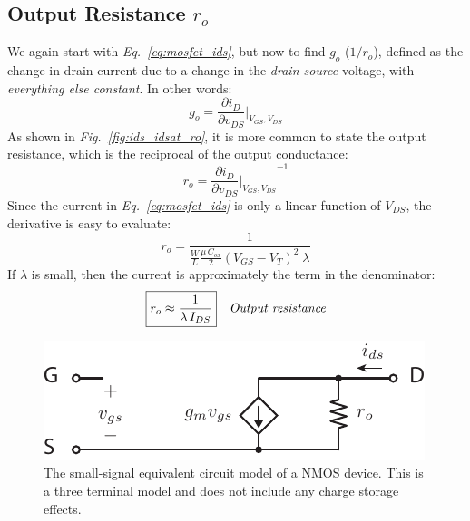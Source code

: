 \subsection{Output Resistance \texorpdfstring{$r_o$}{}}
We again start with \emph{Eq.~\ref{eq:mosfet_ids}}, but now to find $g_o$ ($1/r_o$), defined as the change in drain current due to a change in the \textit{drain-source} voltage, with \textit{everything else constant}.  In other words:
    \begin{equation}
        g_o = \frac{\partial i_D}{\partial v_{DS}} \bigg\rvert_{V_{GS},V_{DS}}
    \end{equation}
As shown in \emph{Fig.~\ref{fig:ids_idsat_ro}}, it is more common to state the output resistance, which is the reciprocal of the output conductance:
    \begin{equation}
        r_o = {\frac{\partial i_D}{\partial v_{DS}} \bigg\rvert_{V_{GS},V_{DS}}}^{-1}
    \end{equation}
Since the current in \emph{Eq.~\ref{eq:mosfet_ids}} is only a linear function of $V_{DS}$, the derivative is easy to evaluate:
    \begin{equation}
        r_o = \frac{1} {\frac{W}{L}\frac{\mu\,C_{ox}}{2} {(V_{GS} - V_T)}^2\;\lambda}
    \end{equation}
If $\lambda$ is small, then the current is approximately the term in the denominator:
    \begin{align}
        \Aboxed{r_o &\approx \frac{1}{\lambda\,I_{DS}}} &\textit{Output resistance}
    \end{align}
\newpage
\begin{figure}[t]
\centering
\includegraphics[scale=1.5]{mos3term_ac_nocap}
\caption{The small-signal equivalent circuit model of a NMOS device.  This is a three terminal model and does not include any charge storage effects.}
\label{fig:mos3term_ac_nocap}
\end{figure}
